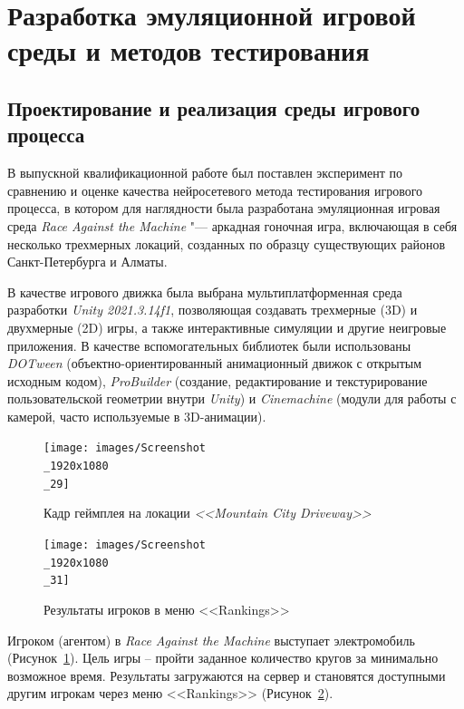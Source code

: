 \section{Разработка эмуляционной игровой среды и методов тестирования}

\subsection{Проектирование и реализация среды игрового процесса}
В выпускной квалификационной работе был поставлен эксперимент по сравнению и оценке качества нейросетевого метода тестирования игрового процесса, в котором для наглядности была разработана эмуляционная игровая среда \textit{Race Against the Machine} "--- аркадная гоночная игра, включающая в себя несколько трехмерных локаций, созданных по образцу существующих районов Санкт-Петербурга и Алматы.

В качестве игрового движка была выбрана мультиплатформенная среда разработки \textit{Unity 2021.3.14f1}, позволяющая создавать трехмерные (3D) и двухмерные (2D) игры, а также интерактивные симуляции и другие неигровые приложения. В качестве вспомогательных библиотек были использованы \textit{DOTween} (объектно-ориентированный анимационный движок с открытым исходным кодом), \textit{ProBuilder} (создание, редактирование и текстурирование пользовательской геометрии внутри \textit{Unity}) и \textit{Cinemachine} (модули для работы с камерой, часто используемые в 3D-анимации).

\begin{figure}
	\centering
	\texttt{[image: images/Screenshot\\\_1920x1080\\\_29]}
	\caption{Кадр геймплея на локации \textit{<<Mountain City Driveway>>}}
	\label{fig:mcdScreenshot}
\end{figure}

\begin{figure}
	\centering
	\texttt{[image: images/Screenshot\\\_1920x1080\\\_31]}
	\caption{Результаты игроков в меню <<Rankings>>}
	\label{fig:rankings}
\end{figure}

Игроком (агентом) в \textit{Race Against the Machine} выступает электромобиль (Рисунок~\ref{fig:mcdScreenshot}). Цель игры -- пройти заданное количество кругов за минимально возможное время. Результаты загружаются на сервер и становятся доступными другим игрокам через меню <<Rankings>> (Рисунок~\ref{fig:rankings}).

